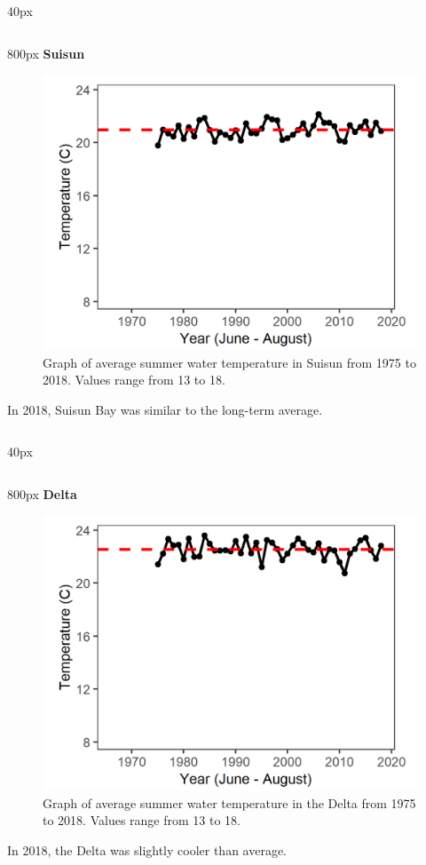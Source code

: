 \documentclass[
]{book}
\begin{document}
\begin{column}{40px\textwidth}
~
\end{column}

\begin{column}{800px\textwidth}
\textbf{Suisun}

\begin{figure}
\includegraphics[width=15.25in]{figures/temp_sssummer} \caption{Graph of average summer water temperature in Suisun from 1975 to 2018. Values range from 13 to 18.}\label{fig:unnamed-chunk-58}
\end{figure}

In 2018, Suisun Bay was similar to the long-term average.
\end{column}

\begin{column}{40px\textwidth}
~
\end{column}

\begin{column}{800px\textwidth}
\textbf{Delta}

\begin{figure}
\includegraphics[width=15.25in]{figures/temp_dtsummer} \caption{Graph of average summer water temperature in the Delta from 1975 to 2018. Values range from 13 to 18.}\label{fig:unnamed-chunk-59}
\end{figure}

In 2018, the Delta was slightly cooler than average.
\end{column}
\end{document}
